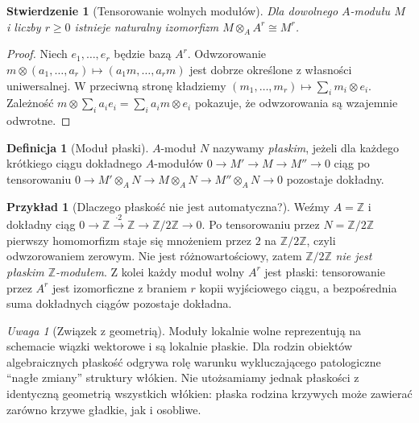 \documentclass[11pt,a4paper,openany]{report}
\numberwithin{equation}{section}
\theoremstyle{plain}
\newtheorem{stwierdzenie}[twierdzenie]{Stwierdzenie}
\theoremstyle{definition}
\newtheorem{definicja}[twierdzenie]{Definicja}
\newtheorem{przyklad}[twierdzenie]{Przykład}
\theoremstyle{remark}
\newtheorem{uwaga}[twierdzenie]{Uwaga}
\newcommand{\Z}{\mathbb Z}
\begin{document}
\begin{stwierdzenie}[Tensorowanie wolnych modułów]
Dla dowolnego $A$-modułu $M$ i liczby $r\ge0$
istnieje naturalny izomorfizm
$M\otimes_A A^r\cong M^r$.
\end{stwierdzenie}
\begin{proof}
Niech $e_1,\ldots,e_r$ będzie bazą $A^r$.
Odwzorowanie $m\otimes(a_1,\ldots,a_r)
\mapsto(a_1m,\ldots,a_rm)$ jest dobrze określone
z własności uniwersalnej. W przeciwną stronę
kładziemy $(m_1,\ldots,m_r)\mapsto
\sum_i m_i\otimes e_i$. Zależność
$m\otimes\sum_i a_i e_i=\sum_i a_i m\otimes e_i$
pokazuje, że odwzorowania są wzajemnie odwrotne.
\end{proof}

\begin{definicja}[Moduł płaski]
$A$-moduł $N$ nazywamy \emph{płaskim},
jeżeli dla każdego krótkiego ciągu dokładnego
$A$-modułów $0\to M'\to M\to M''\to0$
ciąg po tensorowaniu
$0\to M'\otimes_A N\to M\otimes_A N
\to M''\otimes_A N\to0$ pozostaje dokładny.
\end{definicja}

\begin{przyklad}[Dlaczego płaskość nie jest automatyczna?]
Weźmy $A=\Z$ i dokładny ciąg
$0\to\Z\xrightarrow{\cdot2}\Z\to\Z/2\Z\to0$.
Po tensorowaniu przez $N=\Z/2\Z$ pierwszy
homomorfizm staje się mnożeniem przez $2$
na $\Z/2\Z$, czyli odwzorowaniem zerowym.
Nie jest różnowartościowy, zatem $\Z/2\Z$
\emph{nie jest płaskim $\Z$-modułem}.
Z kolei każdy moduł wolny $A^r$ jest płaski:
tensorowanie przez $A^r$ jest izomorficzne
z braniem $r$ kopii wyjściowego ciągu,
a bezpośrednia suma dokładnych ciągów pozostaje
dokładna.
\end{przyklad}

\begin{uwaga}[Związek z geometrią]
Moduły lokalnie wolne reprezentują na schemacie
wiązki wektorowe i są lokalnie płaskie.
Dla rodzin obiektów algebraicznych płaskość
odgrywa rolę warunku wykluczającego patologiczne
``nagłe zmiany'' struktury włókien. Nie utożsamiamy
jednak płaskości z identyczną geometrią wszystkich
włókien: płaska rodzina krzywych może zawierać
zarówno krzywe gładkie, jak i osobliwe.
\end{uwaga}
\end{document}
